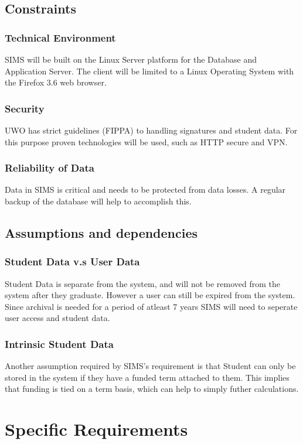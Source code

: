 \documentclass[11pt,a4paper]{report}
\begin{document}
\subsection{Constraints}

\subsubsection{Technical Environment}
SIMS will be built on the Linux Server platform for the Database and Application Server. The client will be limited to a Linux Operating System with the Firefox 3.6 web browser.  
\subsubsection{Security}
UWO has strict guidelines (FIPPA) to handling signatures and student data. For this purpose proven technologies will be used, such as HTTP secure and VPN.
\subsubsection{Reliability of Data}
Data in SIMS is critical and needs to be protected from data losses. A regular backup of the database will help to accomplish this. 

\subsection{Assumptions and dependencies}
\subsubsection{Student Data v.s User Data }
Student Data is separate from the system, and will not be removed from the system after they graduate. However a user can still be expired from the system. Since archival is needed for a period of atleast 7 years SIMS will need to seperate user access and student data. 
\subsubsection{Intrinsic Student Data }
Another assumption required by SIMS's requirement is that Student can only be stored in the system if they have a funded term attached to them. This implies that funding is tied on a term basis, which can help to simply futher calculations. 

\section{Specific Requirements}
\end{document}
